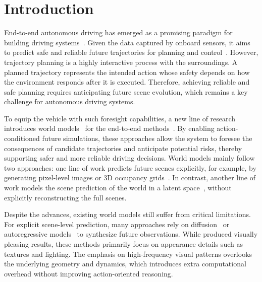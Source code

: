 

\section{Introduction}
End-to-end autonomous driving has emerged as a promising paradigm for building driving systems~\cite{chen2024end,chib2023recent, dong2025end,hu2025vision}. Given the data captured by onboard sensors, it aims to predict safe and reliable future trajectories for planning and control~\cite{hu2025vision, chen2024vadv2, weng2024paradrive}. However, trajectory planning is a highly interactive process with the surroundings. A planned trajectory represents the intended action whose safety depends on how the environment responds after it is executed. 
Therefore, achieving reliable and safe planning requires anticipating future scene evolution, which remains a key challenge for autonomous driving systems.%






To equip the vehicle with such foresight capabilities, a new line of research introduces world models~\cite{allen1983planning, kong20253d} for the end-to-end methods~\cite{guan2024world, wang2024drivingfuture}. By enabling action-conditioned future simulations, these approaches allow the system to foresee the consequences of candidate trajectories and anticipate potential risks, thereby supporting safer and more reliable driving decisions. 
World models mainly follow two approaches: one line of work predicts future scenes explicitly, for example, by generating pixel-level images or 3D occupancy grids~\cite{wang2024drivedreamer, zhang2025epona, zheng2024occworld, yang2025drivingoccworld}. In contrast, another line of work models the scene prediction of the world in a latent space~\cite{li2024law, zheng2025world4drive, yang2025worldrft}, without explicitly reconstructing the full scenes.


Despite the advances, existing world models still suffer from critical limitations. For explicit scene-level prediction, many approaches rely on diffusion~\cite{podell2023sdxl,gao2023magicdrive} or autoregressive models~\cite{zhang2025epona,hu2023gaia} to synthesize future observations. While produced visually pleasing results, these methods primarily focus on appearance details such as textures and lighting. The emphasis on high-frequency visual patterns overlooks the underlying geometry and dynamics, which introduces extra computational overhead without improving action-oriented reasoning.

